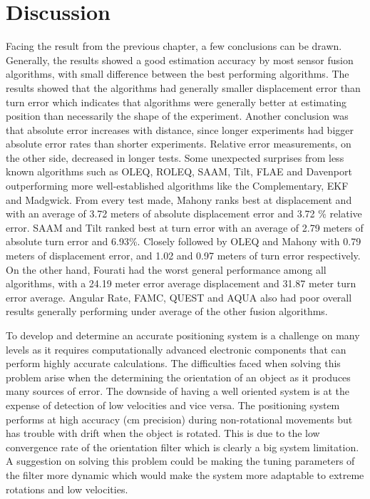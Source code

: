 \section{Discussion}
Facing the result from the previous chapter, a few conclusions can be drawn. Generally, the results showed a good estimation accuracy by most sensor fusion algorithms, with small difference between the best performing algorithms. The results showed that the algorithms had generally smaller displacement error than turn error which indicates that algorithms were generally better at estimating position than necessarily the shape of the experiment. Another conclusion was that absolute error increases with distance, since longer experiments had bigger absolute error rates than shorter experiments. Relative error measurements, on the other side, decreased in longer tests. Some unexpected surprises from less known algorithms such as OLEQ, ROLEQ, SAAM, Tilt, FLAE and Davenport outperforming more well-established algorithms like the Complementary, EKF and Madgwick. From every test made, Mahony ranks best at displacement and with an average of 3.72 meters of absolute displacement error and 3.72
\% relative error. SAAM and Tilt ranked best at turn error with an average of 2.79 meters of absolute turn error and 6.93\%. Closely followed by OLEQ and Mahony with 0.79 meters of displacement error, and 1.02 and 0.97 meters of turn error respectively. On the other hand, Fourati had the worst general performance among all algorithms, with a 24.19 meter error average displacement and 31.87 meter turn error average. Angular Rate, FAMC, QUEST and AQUA also had poor overall results generally performing under average of the other fusion algorithms.

\vspace{-0.5cm}

\vspace{-1.5cm}

\vspace{-0.5cm}

\vspace{-1.5cm}

\vspace{-0.5cm}

\vspace{-1.5cm}

To develop and determine an accurate positioning system is a challenge on many levels as it requires computationally advanced electronic components that can perform highly accurate calculations. The difficulties faced when solving this problem arise when the determining the orientation of an object as it produces many sources of error. The downside of having a well oriented system is at the expense of detection of low velocities and vice versa. The positioning system performs at high accuracy (cm precision) during non-rotational movements but has trouble with drift when the object is rotated. This is due to the low convergence rate of the orientation filter which is clearly a big system limitation. A suggestion on solving this problem could be making the tuning parameters of the filter more dynamic which would make the system more adaptable to extreme rotations and low velocities.

